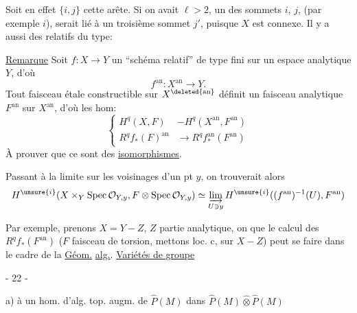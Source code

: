 Soit en effet $\{i,j\}$ cette arête. Si on avait $\ell>2$, un des sommets $i$, $j$, (par exemple $i$), serait lié à un troisième sommet $j'$, puisque $X$ est connexe.
Il y a aussi des  relatifs du type:

\uline{Remarque} Soit $f:X\to Y$ un ``schéma relatif'' de type fini sur un espace analytique $Y$, d'où
\[
f^{\mathrm{an}}:X^{\mathrm{an}}\longrightarrow Y.
\]
Tout faisceau étale constructible  sur $X^{\deleted{\mathrm{an}}}$ définit un faisceau analytique $F^{\mathrm{an}}$ sur $X^{\mathrm{an}}$, d'où les hom:
\[
\left\{\begin{aligned}
H^q(X,F)&-H^q(X^{\mathrm{an}},F^{\mathrm{an}})\\
R^qf_*(F)^{\mathrm{an}}&\longrightarrow R^qf_*^{\mathrm{an}}(F^{\mathrm{an}})
\end{aligned}\right.
\]
À prouver que ce sont des \uline{isomorphismes}.


\uline{} Passant à la limite sur les voisinages d'un pt $y$, on trouverait alors
\[
H^{\unsure{i}}(X\times_Y\operatorname{Spec}\mathcal O_{Y,y},F\otimes\operatorname{Spec}\mathcal O_{Y,y})
\simeq\varinjlim_{U\ni y}H^{\unsure{i}}((f^{\mathrm{an}})^{-1}(U),F^{\mathrm{an}})
\]

Par exemple, prenons $X=Y-Z$, $Z$ partie analytique, on  que le calcul des $R^qf_*(F^{\mathrm{an}})$ ($F$ faisceau de torsion, mettons loc. c, sur $X-Z$)  peut se faire dans le cadre de la \uline{Géom.} \uline{alg.}.
\uline{Variétés de groupe}
\begin{center}- 22 -\end{center}

a) à un hom. d'alg. top. augm. de $\widehat P(M)$ dans $\widehat P(M)\widehat\otimes\widehat P(M)$

